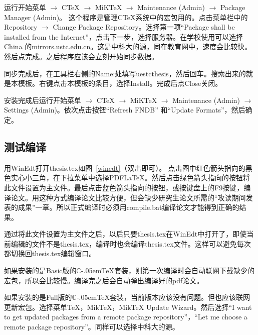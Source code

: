 运行开始菜单 $\longrightarrow$ CTeX $\longrightarrow$ MiKTeX $\longrightarrow$ Maintenance (Admin) $\longrightarrow$ Package Manager (Admin)。 这个程序是管理CTeX系统中的宏包用的。点击菜单栏中的Repository $\longrightarrow$ Change Package Repository。选择第一项“Package shall be installed from the Internet”，点击下一步，选择服务器。在学校使用可以选择China 的mirrors.ustc.edu.cn。这是中科大的源，同在教育网中，速度会比较快。然后点完成。之后程序应该会立刻开始同步数据。

同步完成后，在工具栏右侧的Name:处填写uestcthesis，然后回车。搜索出来的就是本模板。右键点击本模板的条目，选择Install。完成后点Close关闭。

安装完成后运行开始菜单 $\longrightarrow$ CTeX $\longrightarrow$ MiKTeX $\longrightarrow$ Maintenance (Admin) $\longrightarrow$ Settings (Admin)。依次点击按钮“Refresh FNDB” 和“Update Formats”，然后确定。
\subsection{测试编译}
用WinEdt打开thesis.tex如图~\ref{winedt}（双击即可）。
点击图中红色箭头指向的黑色实心小三角，在下拉菜单中选择PDFLaTeX。然后点击绿色箭头指向的按钮将此文件设置为主文件。最后点击蓝色箭头指向的按钮，或按键盘上的F9按键，编译论文。用这种方式编译论文比较方便，但会缺少研究生论文所需的“攻读期间发表的成果”一章。所以正式编译时必须用compile.bat编译论文才能得到正确的结果。

通过将此文件设置为主文件之后，以后只要thesis.tex在WinEdt中打开了，即使当前编辑的文件不是thesis.tex，编译时也会编译thesis.tex文件。这样可以避免每次都切换回thesis.tex编辑窗口。

如果安装的是Basic版的$\mathbb{C}$\kern-.05em\TeX{}套装，则第一次编译时会自动联网下载缺少的宏包，所以会比较慢。编译完之后会自动弹出编译好的pdf论文。

如果安装的是Full版的$\mathbb{C}$\kern-.05em\TeX{}套装，当前版本应该没有问题。但也应该联网更新宏包。选择菜单TeX，MikTeX，MikTeX Update Wizard。然后选择“I want to get updated packages from a remote package repository”，“Let me choose a remote package repository”。同样可以选择中科大的源。
